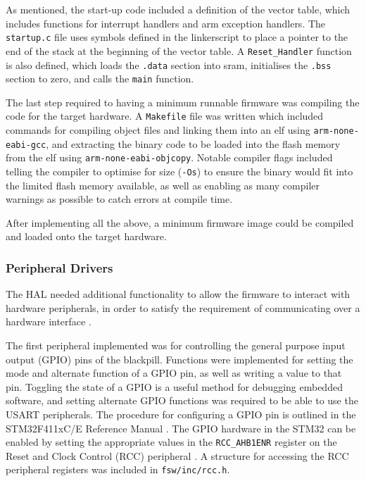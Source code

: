 \documentclass[../report.tex]{subfiles}
\begin{document}
As mentioned, the start-up code included a definition of the vector table, which
includes functions for interrupt handlers and arm exception handlers.
The \lstinline|startup.c| file uses symbols defined in the linkerscript to
place a pointer to the end of the stack at the beginning of the vector table.
A \lstinline|Reset_Handler| function is also defined, which loads the
\lstinline|.data| section into sram, initialises the \lstinline|.bss| section
to zero, and calls the \lstinline|main| function.

The last step required to having a minimum runnable firmware was compiling the
code for the target hardware. A \lstinline|Makefile| file was written which
included commands for compiling object files and linking them into an elf using
\lstinline|arm-none-eabi-gcc|, and extracting the binary code to be loaded into
the flash memory from the elf using \lstinline|arm-none-eabi-objcopy|. Notable
compiler flags included telling the compiler to optimise for size
(\lstinline|-Os|) to ensure the binary would fit into the limited flash memory
available, as well as enabling as many compiler warnings as possible to catch
errors at compile time.

After implementing all the above, a minimum firmware image could be compiled
and loaded onto the target hardware.

\subsubsection{Peripheral Drivers}

The HAL needed additional functionality to allow the firmware to interact with
hardware peripherals, in order to satisfy the requirement of communicating over
a hardware interface .

The first peripheral implemented was for controlling the general purpose input
output (GPIO) pins of the blackpill. Functions were implemented for setting the
mode and alternate function of a GPIO pin, as well as writing a value to that
pin. Toggling the state of a GPIO is a useful method for debugging embedded
software, and setting alternate GPIO functions was required to be able to use the
USART peripherals. The procedure for configuring a GPIO pin is outlined in the
STM32F411xC/E Reference Manual \citep{stm32f4_manual}. The GPIO hardware in the
STM32 can be enabled by setting the appropriate values in the
\lstinline|RCC_AHB1ENR| register on the Reset and Clock Control (RCC)
peripheral \citep{stm32f4_manual}. A structure for accessing the RCC peripheral
registers was included in \lstinline|fsw/inc/rcc.h|.
\end{document}
